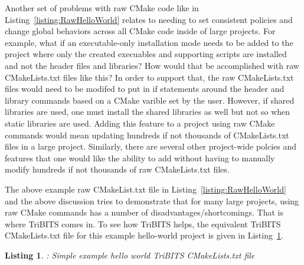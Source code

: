 \documentclass[note]{TechNote}
\newtheorem{listing}{Listing}
\begin{document}
Another set of problems with raw CMake code like in Listing~\ref{listing:RawHelloWorld} relates to needing to set consistent policies and change global behaviors across all CMake code inside of large projects.  For example, what if an executable-only installation mode needs to be added to the project where only the created execuables and supporting scripts are installed and not the header files and libraries?  How would that be accomplished with raw CMakeLists.txt files like this?  In order to support that, the raw CMakeLists.txt files would need to be modifed to put in if statements around the header and library  commands based on a CMake varible set by the user.  However, if shared libraries are used, one must install the shared libraries as well but not so when static libraries are used.  Adding this feature to a project using raw CMake commands would mean updating hundreds if not thousands of CMakeLists.txt files in a large project.  Similarly, there are several other project-wide polcies and features that one would like the ability to add without having to manually modify hundreds if not thousands of raw CMakeLists.txt files.

The above example raw CMakeList.txt file in Listing~\ref{listing:RawHelloWorld} and the above discussion tries to demonstrate that for many large projects, using raw CMake commands has a number of disadvantages/shortcomings.  That is where TriBITS comes in.  To see how TriBITS helps, the equivalent TriBITS CMakeLists.txt file for this example hello-world project is given in Listing~\ref{listing:TribitsHelloWorld}.

\begin{listing}: Simple example hello world TriBITS CMakeLists.txt file
\label{listing:TribitsHelloWorld}
{\small

}
\end{listing}
\end{document}
